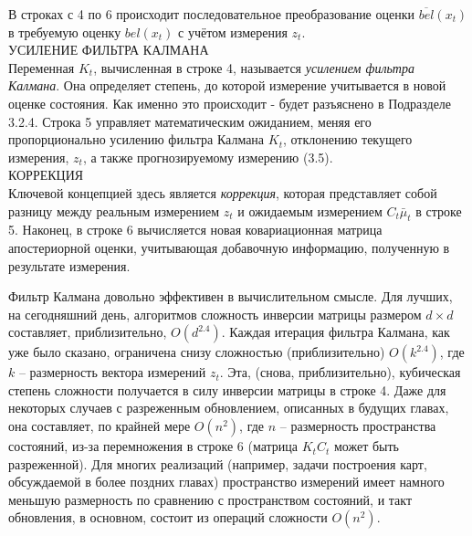 \documentclass[10pt,a4paper]{article}
\begin{document}
В строках с 4 по 6 происходит последовательное преобразование оценки $\overline{bel}(x_t)$  в требуемую оценку $bel(x_t)$ с учётом измерения $z_t$.\\
УСИЛЕНИЕ ФИЛЬТРА КАЛМАНА\\
Переменная $K_t$, вычисленная в строке 4, называется \textit{усилением фильтра Калмана}. Она определяет степень, до которой измерение учитывается в новой оценке состояния. Как именно это происходит - будет разъяснено в Подразделе 3.2.4. Строка 5 управляет математическим ожиданием, меняя его пропорционально усилению фильтра Калмана $K_t$, отклонению текущего измерения, $z_t$, а также прогнозируемому измерению (3.5).\\
КОРРЕКЦИЯ\\
Ключевой концепцией здесь является \textit{коррекция}, которая представляет собой разницу между реальным измерением $z_t$ и ожидаемым измерением $C_t \bar{\mu}_t$ в строке 5. Наконец, в строке 6 вычисляется новая ковариационная матрица апостериорной оценки, учитывающая добавочную информацию, полученную в результате измерения.

Фильтр Калмана довольно эффективен в вычислительном смысле. Для лучших, на сегодняшний день, алгоритмов сложность инверсии матрицы размером $d\times d$ составляет, приблизительно, $O(d^{2.4})$. Каждая итерация фильтра Калмана, как уже было сказано, ограничена снизу сложностью (приблизительно) $O(k^{2.4})$, где $k$ – размерность вектора измерений $z_t$. Эта, (снова, приблизительно), кубическая степень сложности получается в силу инверсии матрицы в строке 4. Даже для некоторых случаев с разреженным обновлением, описанных в будущих главах, она составляет, по крайней мере $O(n^2)$, где $n$ – размерность пространства состояний, из-за перемножения в строке 6 (матрица $K_t C_t$ может быть разреженной). Для многих реализаций (например, задачи построения карт, обсуждаемой в более поздних главах) пространство измерений имеет намного меньшую размерность по сравнению с пространством состояний, и такт обновления, в основном, состоит из операций сложности $O(n^2)$.\\
\end{document}
